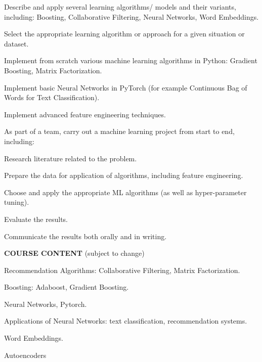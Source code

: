 \documentclass[11pt]{article}
\newenvironment{itemize*}%
  {\begin{itemize}%
    \setlength{\itemsep}{0pt}%
    \setlength{\parskip}{0pt}}%
  {\end{itemize}}
\begin{document}
\begin{itemize*}
\item	Describe and apply several learning algorithms/ models and their variants, including: Boosting, Collaborative Filtering, Neural Networks, Word Embeddings.
\item	Select the appropriate learning algorithm or approach for a given situation or dataset.
\item Implement from scratch various machine learning algorithms in Python: Gradient Boosting, Matrix Factorization.
\item Implement basic Neural Networks in PyTorch (for example Continuous Bag of Words for Text Classification).
\item Implement advanced feature engineering techniques.
\item	As part of a team, carry out a machine learning project from start to end, including:
\begin{itemize*}
\item Research literature related to the problem.
\item Prepare the data for application of algorithms, including feature engineering.
\item	Choose and apply the appropriate ML algorithms (as well as hyper-parameter tuning).
\item Evaluate the results.
\item Communicate the results both orally and in writing.
\end{itemize*}
\end{itemize*}

\noindent \textbf{COURSE CONTENT} (subject to change)

\vspace{-0.05in}

\begin{itemize*}
\item	Recommendation Algorithms: Collaborative Filtering, Matrix Factorization.
\item Boosting: Adaboost, Gradient Boosting.
\item Neural Networks, Pytorch.
\item Applications of Neural Networks: text classification, recommendation systems.
\item Word Embeddings.
\item Autoencoders
\end{itemize*}
\vspace{0.1in}
\end{document}
